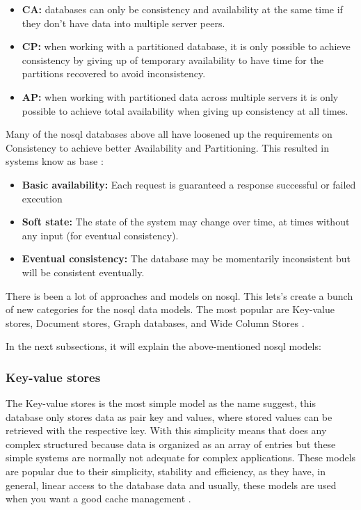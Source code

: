 \begin{itemize}
    \item \textbf{CA:} databases can only be consistency and availability at the same time if they don't have data into multiple server peers.
    \item \textbf{CP:} when working with a partitioned database, it is only possible to achieve consistency by giving up of temporary availability to have time for the partitions recovered to avoid inconsistency.
    \item \textbf{AP:} when working with partitioned data across multiple servers it is only possible to achieve total availability when giving up consistency at all times.
\end{itemize}



Many of the \gls{nosql} databases above all have loosened up the requirements on Consistency to achieve better Availability and Partitioning. This resulted in systems know as \gls{base}  \cite{base,cattell2011scalable,Startednosql}:
\begin{itemize}
    \item \textbf{Basic availability:} Each request is guaranteed a response successful or failed execution
    \item \textbf{Soft state:} The state of the system may change over time, at times without any input (for eventual consistency).
    \item \textbf{Eventual consistency:} The database may be momentarily inconsistent but will be consistent eventually.
\end{itemize}


There is been a lot of approaches and models on \gls{nosql}. This lets's create a bunch of new categories for the \gls{nosql} data models. The most popular are Key-value stores, Document stores, Graph databases, and Wide Column Stores \cite{nosqlchoose,5410700,li2013performance}.

In the next subsections, it will explain the above-mentioned \gls{nosql} models:


\subsubsection{Key-value stores}

The Key-value stores is the most simple model as the name suggest, this database only stores data as pair key and values, where stored values can be retrieved with the respective key. With this simplicity means that does any complex structured because data is organized as an array of entries but these simple systems are normally not adequate for complex applications.
These models are popular due to their simplicity, stability and efficiency, as they have, in general, linear access to the database data and usually, these models are used when you want a good cache management \cite{wuoverview,Startednosql,tiwari_2011,nosqlchoose,sabrina1448}. 

